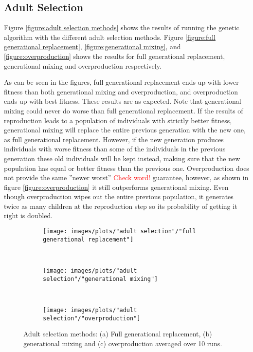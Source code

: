 \subsection{Adult Selection}
Figure \ref{figure:adult selection methods} shows the results of running the genetic algorithm with the different adult selection methods. Figure \ref{figure:full generational replacement}, \ref{figure:generational mixing}, and \ref{figure:overproduction} shows the results for full generational replacement, generational mixing and overproduction respectively. 

As can be seen in the figures, full generational replacement ends up with lower fitness than both generational mixing and overproduction, and overproduction ends up with best fitness. These results are as expected. Note that generational mixing could never do worse than full generational replacement. If the results of reproduction leads to a population of individuals with strictly better fitness, generational mixing will replace the entire previous generation with the new one, as full generational replacement. However, if the new generation produces individuals with worse fitness than some of the individuals in the previous generation these old individuals will be kept instead, making sure that the new population has equal or better fitness than the previous one. Overproduction does not provide the same ''newer worst'' \textcolor{red}{Check word!} guarantee, however, as shown in figure \ref{figure:overproduction} it still outperforms generational mixing. Even though overproduction wipes out the entire previous population, it generates twice as many children at the reproduction step so its probability of getting it right is doubled. 


\begin{figure}[h!]
    \centering
    \begin{subfigure}[b]{0.31\textwidth}
        \texttt{[image: images/plots/"adult selection"/"full generational replacement"]}
        \caption{}
        \hfill
        \label{plot:full generational replacement}
    \end{subfigure}
    ~
    \begin{subfigure}[b]{0.31\textwidth}
        \texttt{[image: images/plots/"adult selection"/"generational mixing"]}
        \caption{}
        \hfill
        \label{plot:generational mixing}
    \end{subfigure}
    ~
    \begin{subfigure}[b]{0.31\textwidth}
        \texttt{[image: images/plots/"adult selection"/"overproduction"]}
        \caption{}
        \hfill
        \label{plot:overproduction}
    \end{subfigure}
    \caption{Adult selection methods: (a) Full generational replacement, (b) generational mixing and (c) overproduction averaged over 10 runs.}
    \label{plot:adult selection methods}
\end{figure}


